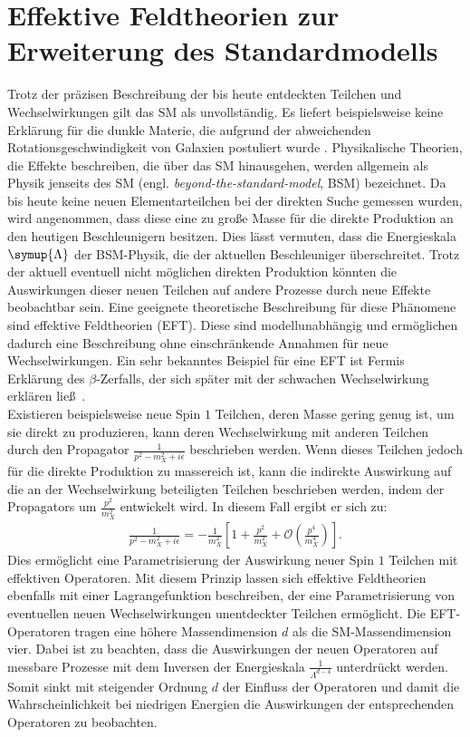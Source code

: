 \section{Effektive Feldtheorien zur Erweiterung des Standardmodells}
Trotz der präzisen Beschreibung der bis heute entdeckten Teilchen und Wechselwirkungen gilt das SM als unvollständig. Es liefert beispielsweise keine Erklärung für die dunkle Materie, die aufgrund der abweichenden Rotationsgeschwindigkeit von Galaxien postuliert wurde \cite{1937ApJ....86..217Z}. Physikalische Theorien, die Effekte beschreiben, die über das SM hinausgehen, werden allgemein als Physik jenseits des SM (engl. \textit{beyond-the-standard-model}, BSM) bezeichnet. Da bis heute keine neuen Elementarteilchen bei der direkten Suche gemessen wurden, wird angenommen, dass diese eine zu große Masse für die direkte Produktion an den heutigen Beschleunigern besitzen. Dies lässt vermuten, dass die Energieskala $\symup{\Lambda}$ der BSM-Physik, die der aktuellen Beschleuniger überschreitet. Trotz der aktuell eventuell nicht möglichen direkten Produktion könnten die Auswirkungen dieser neuen Teilchen auf andere Prozesse durch neue Effekte beobachtbar sein. Eine geeignete theoretische Beschreibung für diese Phänomene sind effektive Feldtheorien (EFT). Diese sind modellunabhängig und ermöglichen dadurch eine Beschreibung ohne einschränkende Annahmen für neue Wechselwirkungen. Ein sehr bekanntes Beispiel für eine EFT ist Fermis Erklärung des $\beta$-Zerfalls, der sich später mit der schwachen Wechselwirkung erklären ließ~\cite{Fermi1934}.\\
Existieren beispielsweise neue Spin $1$ Teilchen, deren Masse gering genug ist, um sie direkt zu produzieren, kann deren Wechselwirkung mit anderen Teilchen durch den Propagator $\frac{1}{p^2 -m_X^2+i\epsilon}$ beschrieben werden. Wenn dieses Teilchen jedoch für die direkte Produktion zu massereich ist, kann die indirekte Auswirkung auf die an der Wechselwirkung beteiligten Teilchen beschrieben werden, indem der Propagators um $\frac{p^2}{m_X^2}$ entwickelt wird. In diesem Fall ergibt er sich zu:
\begin{align}
    \frac{1}{p^2 -m_X^2 + i\epsilon} = -\frac{1}{m_X^2}\left[ 1 + \frac{p^2}{m_X^2} + \mathcal{O}\left(\frac{p^4}{m_X^4}\right)\right].
\end{align}
Dies ermöglicht eine Parametrisierung der Auswirkung neuer Spin $1$ Teilchen mit effektiven Operatoren.
Mit diesem Prinzip lassen sich effektive Feldtheorien ebenfalls mit einer Lagrangefunktion beschreiben, der eine Parametrisierung von eventuellen neuen Wechselwirkungen unentdeckter Teilchen ermöglicht. Die EFT-Operatoren tragen eine höhere Massendimension $d$ als die SM-Massendimension vier. Dabei ist zu beachten, dass die Auswirkungen der neuen Operatoren auf messbare Prozesse mit dem Inversen der Energieskala $\frac{1}{\Lambda^{d-4}}$ unterdrückt werden.  Somit sinkt mit steigender Ordnung $d$ der Einfluss der Operatoren und damit die Wahrscheinlichkeit bei niedrigen Energien die Auswirkungen der entsprechenden Operatoren zu beobachten.\\
